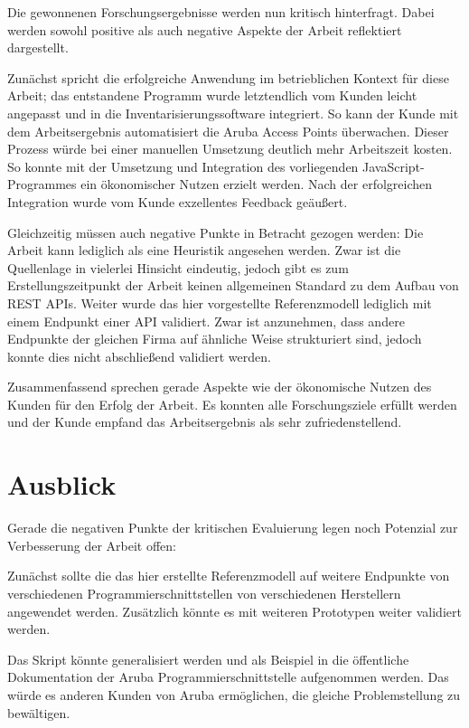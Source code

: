 Die gewonnenen Forschungsergebnisse werden nun kritisch hinterfragt. Dabei werden sowohl positive als auch negative Aspekte der Arbeit reflektiert dargestellt.

Zunächst spricht die erfolgreiche Anwendung im betrieblichen Kontext für diese Arbeit; das entstandene Programm wurde letztendlich vom Kunden leicht angepasst und in die Inventarisierungssoftware integriert. So kann der Kunde mit dem Arbeitsergebnis automatisiert die Aruba Access Points überwachen. Dieser Prozess würde bei einer manuellen Umsetzung deutlich mehr Arbeitszeit kosten. So konnte mit der Umsetzung und Integration des vorliegenden JavaScript-Programmes ein ökonomischer Nutzen erzielt werden. Nach der erfolgreichen Integration wurde vom Kunde exzellentes Feedback geäußert.

Gleichzeitig müssen auch negative Punkte in Betracht gezogen werden: Die Arbeit kann lediglich als eine Heuristik angesehen werden. Zwar ist die Quellenlage in vielerlei Hinsicht eindeutig, jedoch gibt es zum Erstellungszeitpunkt der Arbeit keinen allgemeinen Standard zu dem Aufbau von REST APIs. Weiter wurde das hier vorgestellte Referenzmodell lediglich mit einem Endpunkt einer API validiert. Zwar ist anzunehmen, dass andere Endpunkte der gleichen Firma auf ähnliche Weise strukturiert sind, jedoch konnte dies nicht abschließend validiert werden. 

Zusammenfassend sprechen gerade Aspekte wie der ökonomische Nutzen des Kunden für den Erfolg der Arbeit. Es konnten alle Forschungsziele erfüllt werden und der Kunde empfand das Arbeitsergebnis als sehr zufriedenstellend.

\section{Ausblick}\label{section:ausblick}

Gerade die negativen Punkte der kritischen Evaluierung legen noch Potenzial zur Verbesserung der Arbeit offen:

Zunächst sollte die das hier erstellte Referenzmodell auf weitere Endpunkte von verschiedenen Programmierschnittstellen von verschiedenen Herstellern angewendet werden. Zusätzlich könnte es mit weiteren Prototypen weiter validiert werden.

Das Skript könnte generalisiert werden und als Beispiel in die öffentliche Dokumentation der Aruba Programmierschnittstelle aufgenommen werden. Das würde es anderen Kunden von Aruba ermöglichen, die gleiche Problemstellung zu bewältigen.

